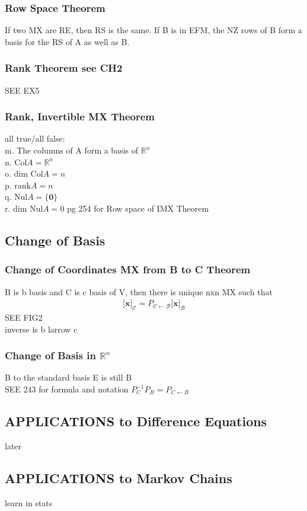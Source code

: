 \documentclass[12pt]{article}
\newcommand{\R}{\mathbb{R}}
\begin{document}
    \subsubsection{Row Space Theorem}
        If two MX are RE, then RS is the same.
        If B is in EFM, the NZ rows of B form a basis for the RS of
        A as well as B.
    \subsubsection{Rank Theorem see CH2}
    
        SEE EX5
    \subsubsection{Rank, Invertible MX Theorem}
        all true/all false:\\
        m. The columns of A form a basis of $\R^n$ \\
        n.  $\text{Col}A = \R^n $ \\  
        o. $ \text{dim Col}A = n $  \\
        p. $ \text{rank} A = n$  \\
        q. $ \text{Nul}A = \{\bm{0}\} $ \\
        r. $ \text{dim Nul} A = 0 $ 
        pg 254 for Row space of IMX Theorem
\subsection{Change of Basis}
    \subsubsection{Change of Coordinates MX from B to C Theorem}
        B is b basis and C is c basis of V, then there is unique nxn MX
        such that
        \begin{align*}
            \big[\bm{x}\big]_{\mathcal{C}} =
            P_{\mathcal{C}\leftarrow \mathcal{B}}  \big[\bm{x}\big]_{\mathcal{B}}
        \end{align*}
        SEE FIG2 \\
        inverse is b larrow c
    \subsubsection{Change of Basis in $\R^n$ }
        B to the standard basis E is still B \\
        SEE 243 for formula and notation
        $ P_C^{-1}P_B = P_{C\leftarrow B} $ 
\subsection{APPLICATIONS to Difference Equations}
    later
\subsection{APPLICATIONS to Markov Chains}
    learn in stats
\end{document}
